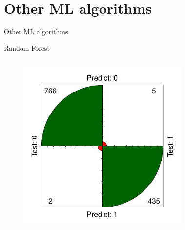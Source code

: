 \documentclass{beamer}
\begin{document}
\section{Other ML algorithms}

\begin{frame}{}
\begin{center}
{\Huge Other ML algorithms}
\end{center}
\end{frame}

\begin{frame}{Random Forest}
\begin{columns}
  \begin{figure}[b]{\textwidth}
    \includegraphics[width=\textwidth]{Pic/RF_confusion.pdf}
  \end{figure} 
  \begin{figure}[b]{\textwidth}

\end{figure}
\end{columns}
\end{frame}
\end{document}
